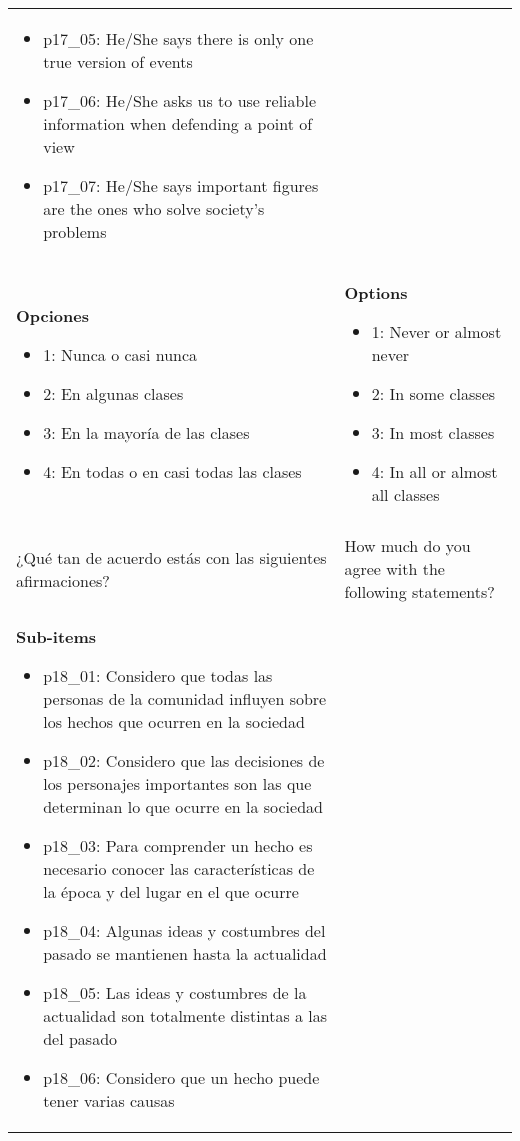 \documentclass[11pt]{article}
\begin{document}
\begin{longtable}{@{}LL@{}}
\begin{itemize}[leftmargin=*]
\item p17\_05: He/She says there is only one true version of events
\item p17\_06: He/She asks us to use reliable information when defending a point of view
\item p17\_07: He/She says important figures are the ones who solve society's problems\end{itemize} \\
\textbf{Opciones}\par\begin{itemize}[leftmargin=*]\item 1: Nunca o casi nunca
\item 2: En algunas clases
\item 3: En la mayoría de las clases
\item 4: En todas o en casi todas las clases\end{itemize} & \textbf{Options}\par\begin{itemize}[leftmargin=*]\item 1: Never or almost never
\item 2: In some classes
\item 3: In most classes
\item 4: In all or almost all classes\end{itemize} \\
\addlinespace[4pt]
 \\ 
¿Qué tan de acuerdo estás con las siguientes afirmaciones? & How much do you agree with the following statements? \\
\textbf{Sub-items}\par\begin{itemize}[leftmargin=*]\item p18\_01: Considero que todas las personas de la comunidad influyen sobre los hechos que ocurren en la sociedad
\item p18\_02: Considero que las decisiones de los personajes importantes son las que determinan lo que ocurre en la sociedad
\item p18\_03: Para comprender un hecho es necesario conocer las características de la época y del lugar en el que ocurre
\item p18\_04: Algunas ideas y costumbres del pasado se mantienen hasta la actualidad
\item p18\_05: Las ideas y costumbres de la actualidad son totalmente distintas a las del pasado
\item p18\_06: Considero que un hecho puede tener varias causas

\end{itemize}
\end{longtable}
\end{document}
